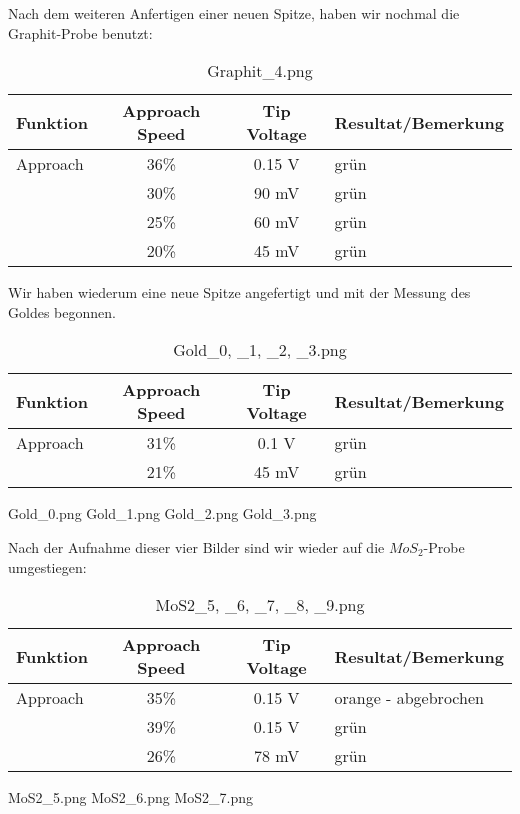
Nach dem weiteren Anfertigen einer neuen Spitze, haben wir nochmal die Graphit-Probe benutzt:

\begin{table}[H]
\caption{Graphit\_4.png}
\centering \begin{tabular}[H]{l c c l}
Funktion & Approach Speed & Tip Voltage & Resultat/Bemerkung\\ \hline
Approach & 36\% & 0.15 V & grün\\
 & 30\% & 90 mV & grün\\
 & 25\% & 60 mV & grün\\
 & 20\% & 45 mV & grün
\end{tabular}
\end{table}


Wir haben wiederum eine neue Spitze angefertigt und mit der Messung des Goldes begonnen. 

\begin{table}[H]
\caption{Gold\_0, \_1, \_2, \_3.png}
\centering \begin{tabular}[H]{l c c l}
Funktion & Approach Speed & Tip Voltage & Resultat/Bemerkung\\ \hline
Approach & 31\% & 0.1 V & grün\\
 & 21\% & 45 mV & grün\\
\end{tabular}
\end{table}

Gold\_0.png 
Gold\_1.png 
Gold\_2.png 
Gold\_3.png 

Nach der Aufnahme dieser vier Bilder sind wir wieder auf die $MoS_2$-Probe umgestiegen:

\begin{table}[H]
\caption{MoS2\_5, \_6, \_7, \_8, \_9.png}
\centering \begin{tabular}[H]{l c c l}
Funktion & Approach Speed & Tip Voltage & Resultat/Bemerkung\\ \hline
Approach & 35\% & 0.15 V & orange - abgebrochen\\
 & 39\% & 0.15 V & grün\\
 & 26\% & 78 mV & grün
\end{tabular}
\end{table}

MoS2\_5.png 
MoS2\_6.png 
MoS2\_7.png 


